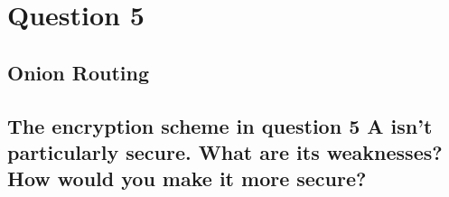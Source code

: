 \documentclass{report}
\begin{document}
	\section{Question 5}
	\startsection
		\renewcommand{\thesubsection}{\thesection.\Alph{subsection}}
		\subsection{Onion Routing}
		\startsubsection
		\closesection
		\subsection{The encryption scheme in question 5 A isn’t particularly secure. What are its weaknesses? How would you make it more secure?}
		\startsubsection
		\closesection
	\closesection
\end{document}
